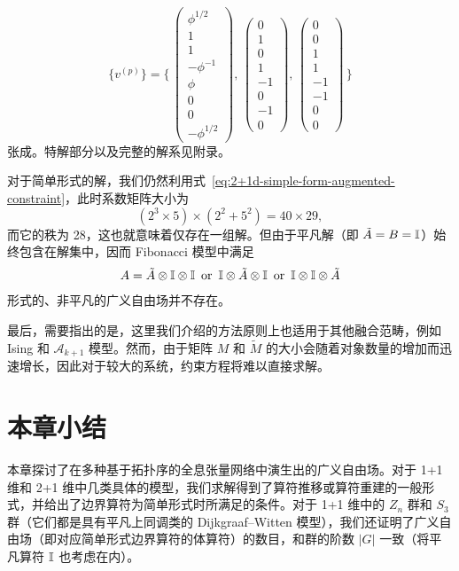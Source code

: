 \begin{equation}
  \{ v^{(p)} \} = \Biggl\{ \,
    \begin{pmatrix} \phi^{1/2} \\ 1 \\ 1 \\ -\phi^{-1} \\ \phi \\ 0 \\ 0 \\ -\phi^{1/2} \end{pmatrix}, \,
    \begin{pmatrix} 0 \\ 1 \\ 0 \\ 1 \\ -1 \\  0 \\ -1 \\ 0 \end{pmatrix}, \,
    \begin{pmatrix} 0 \\ 0 \\ 1 \\ 1 \\ -1 \\ -1 \\  0 \\ 0 \end{pmatrix} \,
  \Biggr\}
\end{equation}
张成。特解部分以及完整的解系见附录。

对于简单形式的解，我们仍然利用式~\eqref{eq:2+1d-simple-form-augmented-constraint}，此时系数矩阵大小为
\begin{equation}
  (2^3 \times 5) \times (2^2 + 5^2) = 40 \times 29,
\end{equation}
而它的秩为 28，这也就意味着仅存在一组解。但由于平凡解（即 $\tilde{A}=B=\mathbb{I}$）始终包含在解集中，因而 Fibonacci 模型中满足
\begin{equation}
  A = \tilde{A} \otimes \mathbb{I} \otimes \mathbb{I} \enspace \text{or} \enspace
      \mathbb{I} \otimes \tilde{A} \otimes \mathbb{I} \enspace \text{or} \enspace
      \mathbb{I} \otimes \mathbb{I} \otimes \tilde{A}
\end{equation}
形式的、非平凡的广义自由场并不存在。

最后，需要指出的是，这里我们介绍的方法原则上也适用于其他融合范畴，例如 Ising 和 $\mathcal{A}_{k+1}$ 模型。然而，由于矩阵 $M$ 和 $\tilde{M}$ 的大小会随着对象数量的增加而迅速增长，因此对于较大的系统，约束方程将难以直接求解。

\section{本章小结}

本章探讨了在多种基于拓扑序的全息张量网络中演生出的广义自由场。对于 1+1 维和 2+1 维中几类具体的模型，我们求解得到了算符推移或算符重建的一般形式，并给出了边界算符为简单形式时所满足的条件。对于 1+1 维中的 $Z_n$ 群和 $S_3$ 群（它们都是具有平凡上同调类的 Dijkgraaf--Witten 模型），我们还证明了广义自由场（即对应简单形式边界算符的体算符）的数目，和群的阶数 $|G|$ 一致（将平凡算符 $\mathbb{I}$ 也考虑在内）。
